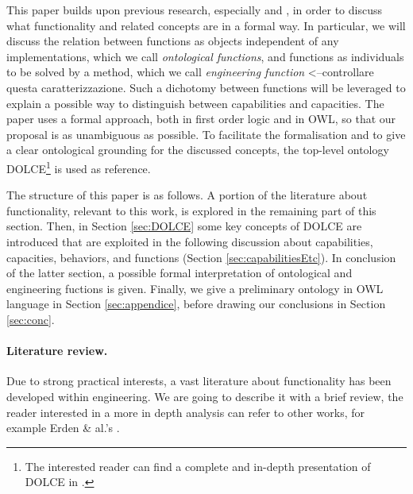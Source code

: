 \documentclass[sw]{iosart2x}
\newcommand{\DOLCE}{\textsc{DOLCE}\xspace} %
\newcommand{\OWL}{\textnormal{OWL}\xspace}
\newcommand{\firstTimeKeyWord}[1]{\textit{#1}}
\newcommand{\TODO}[1]{{\color{red} #1}}
\begin{document}
This paper builds upon previous research, especially \cite{borgoCapabilitiesCapacitiesFunctionalities2021} and \cite{mizoguchiUnifyingDefinitionArtifact2016}, in order to discuss what functionality and related concepts are in a formal way. 
In particular, we will discuss the relation between functions as objects independent of any implementations, which we call \firstTimeKeyWord{ontological functions}, and functions as individuals to be solved by a method, which we call \firstTimeKeyWord{engineering function}\TODO{<--controllare questa caratterizzazione}.
Such a dichotomy between functions will be leveraged to explain a possible way to distinguish between capabilities and capacities.   
The paper uses a formal approach, both in first order logic and in \OWL, so that our proposal is as unambiguous as possible. 
To facilitate the formalisation and to give a clear ontological grounding for the discussed concepts, the top-level ontology \DOLCE\footnote{The interested reader can find a complete and in-depth presentation of \DOLCE in \cite{masoloWonderWebDeliverableD182003}.} is used as reference.   

The structure of this paper is as follows. A portion of the literature about functionality, relevant to this work, is explored in the remaining part of this section. 
Then, in Section \ref{sec:DOLCE} some key concepts of \DOLCE are introduced that are exploited in the following discussion about capabilities, capacities, behaviors, and functions (Section \ref{sec:capabilitiesEtc}). 
In conclusion of the latter section, a possible formal interpretation of ontological and engineering fuctions is given. 
Finally, we give a preliminary ontology in \OWL language in Section \ref{sec:appendice}, before drawing our conclusions in Section \ref{sec:conc}.     %

\paragraph{Literature review. \label{par:review}}%
Due to strong practical interests, a vast literature about functionality has been developed within engineering. 
We are going to describe it with a brief review, the reader interested in a more in depth analysis can refer to other works, for example Erden \& al.'s \cite{erdenReviewFunctionModeling2008}.
\end{document}
